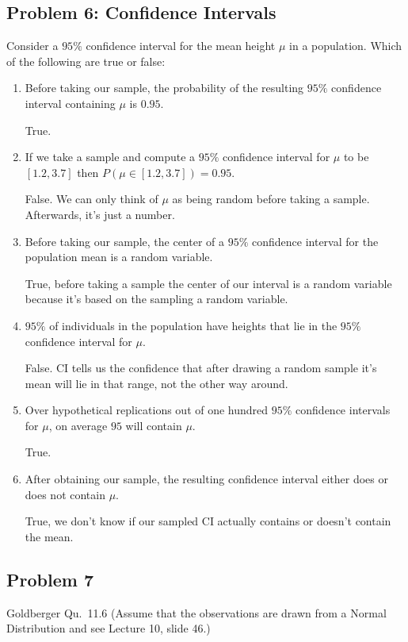 \documentclass{article}
\newcommand{\1}{\mathbf{1}}
\begin{document}
\newpage
\subsection*{Problem 6: Confidence Intervals}
Consider a $95\%$ confidence interval for the mean height $\mu$ in a population. Which of the following are true or false: 
\begin{enumerate}
    \item Before taking our sample,  the probability of the resulting $95\%$ confidence interval containing $\mu$ is $0.95$.
    
    True. 
    
    \item If we take a sample and compute a $95\%$ confidence interval for $\mu$ to be $[1.2,3.7]$ then $P(\mu \in [1.2,3.7]) = 0.95$.
    
    False. We can only think of $\mu$ as being random before taking a sample. Afterwards, it's just a number.
    
    \item Before taking our sample, the center of a $95\%$ confidence interval for the population mean is a random variable.
    
    True, before taking a sample the center of our interval is a random variable because it's based on the sampling a random variable.
    
    \item $95\%$ of individuals in the population have heights that lie in the $95\%$ confidence interval for $\mu$. 
    
    False. CI tells us the confidence that after drawing a random sample it's mean will lie in that range, not the other way around.
    
    \item Over hypothetical replications out of one hundred $95\%$ confidence intervals for $\mu$, on average $95$ will contain $\mu$.
    
    True.
    
    \item After obtaining our sample, the resulting confidence interval either does or does not contain $\mu$.
    
    True, we don't know if our sampled CI actually contains or doesn't contain the mean. 
\end{enumerate}




\newpage
\subsection*{Problem 7}
Goldberger Qu.~11.6 (Assume that the observations are drawn from a Normal Distribution and see Lecture 10, slide 46.)
\end{document}
